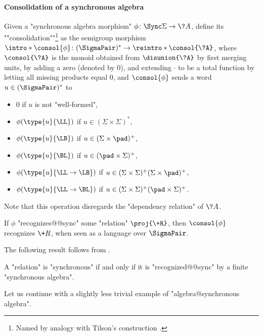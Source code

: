 \paragraph*{Consolidation of a synchronous algebra}
Given a "synchronous algebra morphism" $\phi\colon \Sync\Sigma \to \?A$,
define its \AP""consolidation""\footnote{Named by analogy with Tilson's construction \cite[\S 3, p.~102]{Tilson1987Categories}.} as the semigroup morphism
$\intro*\consol{\phi}\colon (\SigmaPair)^* \to \reintro*\consol{\?A}$, where
$\consol{\?A}$ is the monoid obtained from
$\disunion{\?A}$ by first merging units,
by adding a zero (denoted by $0$), and extending $\cdot$
to be a total function by letting all missing products equal $0$,
and $\consol{\phi}$ sends a word $u \in (\SigmaPair)^*$ to%
\vspace{-1.25em}
\begin{multicols}{2}%
	\begin{itemize}%
		\item $0$ if $u$ is not "well-formed",
		\item $\phi(\type{u}{\LL})$ if $u \in (\Sigma\times \Sigma)^*$,
		\item $\phi(\type{u}{\LB})$ if $u \in (\Sigma\times \pad)^+$,
		\item $\phi(\type{u}{\BL})$ if $u \in (\pad\times \Sigma)^+$,
		\item $\phi(\type{u}{\LL\to\LB})$ if $u \in (\Sigma\times \Sigma)^+(\Sigma\times \pad)^+$,
		\item $\phi(\type{u}{\LL\to\BL})$ if $u \in (\Sigma\times \Sigma)^+(\pad\times \Sigma)^+$.
	\end{itemize}
\end{multicols}
\vspace{-1.25em}
Note that this operation disregards the "dependency relation" of $\?A$.
\begin{fact}
	\AP\label{fact:consolidation}
	If $\phi$ "recognizes@@sync" some "relation" $\proj{\+R}$,
	then $\consol{\phi}$ recognizes $\+R$, when seen as
	a language over $\SigmaPair$.
\end{fact}

The following result follows from .
\begin{proposition}
	\AP\label{prop:synchronous-iff-finite}
	A "relation" is "synchronous" if and only if it is "recognized@@sync"
	by a finite "synchronous algebra".
\end{proposition}

Let us continue with a slightly less trivial example of "algebra@synchronous algebra".

